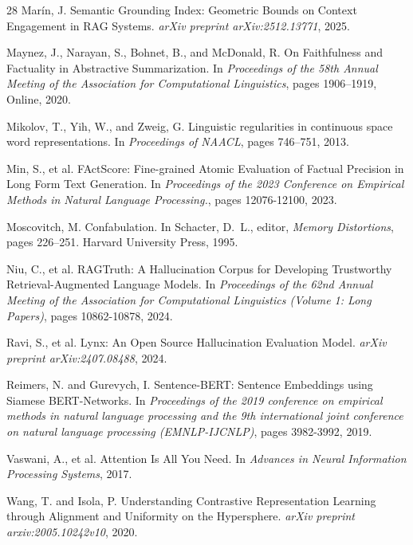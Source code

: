 \documentclass[11pt]{article}
\begin{document}
\begin{thebibliography}{28}
Mar\'{i}n, J.
\newblock Semantic Grounding Index: Geometric Bounds on Context Engagement in RAG Systems.
\newblock \emph{arXiv preprint arXiv:2512.13771}, 2025.

Maynez, J., Narayan, S., Bohnet, B., and McDonald, R.
\newblock On Faithfulness and Factuality in Abstractive Summarization.
\newblock In \emph{Proceedings of the 58th Annual Meeting of the Association for Computational Linguistics}, pages 1906--1919, Online, 2020.

Mikolov, T., Yih, W., and Zweig, G.
\newblock Linguistic regularities in continuous space word representations.
\newblock In \emph{Proceedings of NAACL}, pages 746--751, 2013.

Min, S., et al.
\newblock FActScore: Fine-grained Atomic Evaluation of Factual Precision in Long Form Text Generation.
\newblock In \emph{Proceedings of the 2023 Conference on Empirical Methods in Natural Language Processing.}, pages 12076-12100, 2023.

Moscovitch, M.
\newblock Confabulation.
\newblock In Schacter, D.~L., editor, \emph{Memory Distortions}, pages 226--251. Harvard University Press, 1995.

Niu, C., et al.
\newblock RAGTruth: A Hallucination Corpus for Developing Trustworthy Retrieval-Augmented Language Models.
\newblock In \emph{Proceedings of the 62nd Annual Meeting of the Association for Computational Linguistics (Volume 1: Long Papers)}, pages 10862-10878, 2024.

Ravi, S., et al.
\newblock Lynx: An Open Source Hallucination Evaluation Model.
\newblock \emph{arXiv preprint arXiv:2407.08488}, 2024.

Reimers, N. and Gurevych, I.
\newblock Sentence-BERT: Sentence Embeddings using Siamese BERT-Networks.
\newblock In \emph{Proceedings of the 2019 conference on empirical methods in natural language processing and the 9th international joint conference on natural language processing (EMNLP-IJCNLP)}, pages 3982-3992, 2019.

Vaswani, A., et al.
\newblock Attention Is All You Need.
\newblock In \emph{Advances in Neural Information Processing Systems}, 2017.

Wang, T. and Isola, P.
\newblock Understanding Contrastive Representation Learning through Alignment and Uniformity on the Hypersphere.
\newblock \emph{arXiv preprint arxiv:2005.10242v10}, 2020.

\end{thebibliography}
\end{document}
